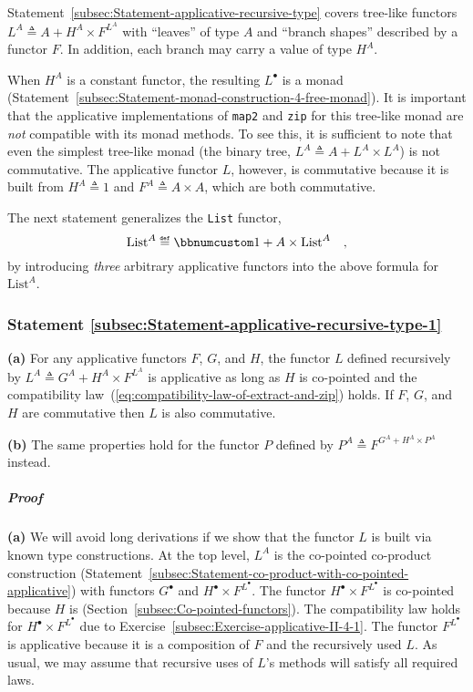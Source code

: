 Statement~\ref{subsec:Statement-applicative-recursive-type} covers
tree-like functors $L^{A}\triangleq A+H^{A}\times F^{L^{A}}$ with
\textsf{``}leaves\textsf{''} of type $A$ and \textsf{``}branch shapes\textsf{''} described by a functor
$F$. In addition, each branch may carry a value of type $H^{A}$.

When $H^{A}$ is a constant functor, the resulting $L^{\bullet}$
is a monad (Statement~\ref{subsec:Statement-monad-construction-4-free-monad}).
It is important that the applicative implementations of \lstinline!map2!
and \lstinline!zip! for this tree-like monad are \emph{not} compatible
with its monad methods. To see this, it is sufficient to note that
even the simplest tree-like monad (the binary tree, $L^{A}\triangleq A+L^{A}\times L^{A}$)
is not commutative. The applicative functor $L$, however, is commutative
because it is built from $H^{A}\triangleq1$ and $F^{A}\triangleq A\times A$,
which are both commutative.

The next statement generalizes the \lstinline!List! functor, 
\[
\text{List}^{A}\triangleq\bbnum 1+A\times\text{List}^{A}\quad,
\]
by introducing \emph{three} arbitrary applicative functors into the
above formula for $\text{List}^{A}$.

\subsubsection{Statement \label{subsec:Statement-applicative-recursive-type-1}\ref{subsec:Statement-applicative-recursive-type-1}}

\textbf{(a)} For any applicative functors $F$, $G$, and $H$, the
functor $L$ defined recursively by $L^{A}\triangleq G^{A}+H^{A}\times F^{L^{A}}$
is applicative as long as $H$ is co-pointed and the compatibility
law~(\ref{eq:compatibility-law-of-extract-and-zip}) holds. If $F$,
$G$, and $H$ are commutative then $L$ is also commutative.

\textbf{(b)} The same properties hold for the functor $P$ defined
by $P^{A}\triangleq F^{G^{A}+H^{A}\times P^{A}}$ instead.

\subparagraph{Proof}

\textbf{(a)} We will avoid long derivations if we show that the functor
$L$ is built via known type constructions. At the top level, $L^{A}$
is the co-pointed co-product construction (Statement~\ref{subsec:Statement-co-product-with-co-pointed-applicative})
with functors $G^{\bullet}$ and $H^{\bullet}\times F^{L^{\bullet}}$.
The functor $H^{\bullet}\times F^{L^{\bullet}}$ is co-pointed because
$H$ is (Section~\ref{subsec:Co-pointed-functors}). The compatibility
law holds for $H^{\bullet}\times F^{L^{\bullet}}$ due to Exercise~\ref{subsec:Exercise-applicative-II-4-1}.
The functor $F^{L^{\bullet}}$ is applicative because it is a composition
of $F$ and the recursively used $L$. As usual, we may assume that
recursive uses of $L$\textsf{'}s methods will satisfy all required laws.

